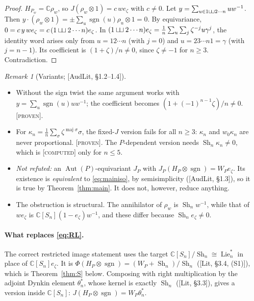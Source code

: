 \documentclass[11pt]{article}
\theoremstyle{definition}
\theoremstyle{remark}
\newtheorem{remark}[theorem]{Remark}
\newcommand{\Aut}{\operatorname{Aut}}
\newcommand{\Lie}{\operatorname{Lie}}
\newcommand{\sgn}{\operatorname{sgn}}
\newcommand{\Sh}{\operatorname{Sh}}
\newcommand{\shuf}{\mathbin{\sqcup\mkern-3mu\sqcup}}
\newcommand{\st}[1]{\textup{[\textsc{#1}]}}
\begin{document}
\begin{proof}
$H_{P_w}=\mathbb C\rho_w$, so $J(\rho_w\otimes1)=c\,we_\zeta$ with $c\ne0$. Let
$y=\sum_{u\in1\shuf2\cdots n}uw^{-1}$. Then
$y\cdot(\rho_w\otimes1)=\pm\sum_u\sgn(u)\rho_u\otimes1=0$. By equivariance,
$0=c\,y\,we_\zeta=c\,(1\shuf2\cdots n)e_\zeta$. In
$(1\shuf2\cdots n)e_\zeta=\frac1n\sum_u\sum_j\zeta^{-j}u\gamma^j$, the
identity word arises only from $u=12\cdots n$ (with $j=0$) and
$u=23\cdots n1=\gamma$ (with $j=n-1$). Its coefficient is
$(1+\zeta)/n\ne0$, since $\zeta\ne-1$ for $n\ge3$. Contradiction.
\end{proof}

\begin{remark}[Variants; {[AudLit, \S1.2--1.4]}]
\begin{itemize}[nosep]
\item Without the sign twist the same argument works with
  $y=\sum_u\sgn(u)uw^{-1}$; the coefficient becomes
  $(1+(-1)^{n-1}\zeta)/n\ne0$. \st{proven}.
\item For $\kappa_n=\frac1n\sum_\sigma\zeta^{\operatorname{maj}\sigma}\sigma$,
  the fixed-$J$ version fails for all $n\ge3$: $\kappa_n$ and $w_0\kappa_n$
  are never proportional. \st{proven}. The $P$-dependent version needs
  $\Sh_n\kappa_n\ne0$, which is \st{computed} only for $n\le5$.
\item \emph{Not refuted:} an $\Aut(P)$-equivariant $J_P$ with
  $J_P(H_P\otimes\sgn)=W_Pe_\zeta$. Its existence is \emph{equivalent} to
  \eqref{eq:mainiso}, by semisimplicity ([AudLit, \S1.3]), so it is true by
  Theorem~\ref{thm:main}. It does not, however, reduce anything.
\item The obstruction is structural. The annihilator of $\rho_w$ is
  $\Sh_n w^{-1}$, while that of $we_\zeta$ is
  $\mathbb C[S_n](1-e_\zeta)w^{-1}$, and these differ because
  $\Sh_ne_\zeta\ne0$.
\end{itemize}
\end{remark}

\paragraph{What replaces \eqref{eq:RL}.} The correct restricted image
statement uses the target $\mathbb C[S_n]/\Sh_n\cong\Lie_n^*$ in place of
$\mathbb C[S_n]e_\zeta$. It is
$\Phi(H_P\otimes\sgn)=(W_P+\Sh_n)/\Sh_n$ ([Lit, \S3.4, (S1)]), which is
Theorem~\ref{thm:S} below. Composing with right multiplication by the adjoint
Dynkin element $\theta_n^*$, whose kernel is exactly $\Sh_n$ ([Lit, \S3.3]),
gives a version inside $\mathbb C[S_n]$: $J(H_P\otimes\sgn)=W_P\theta_n^*$.
\end{document}
